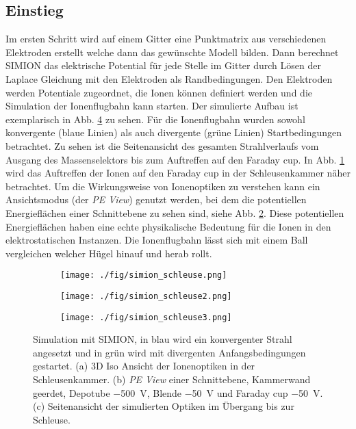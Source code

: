 \subsection{Einstieg}
Im ersten Schritt wird auf einem Gitter eine Punktmatrix aus verschiedenen Elektroden erstellt welche dann das gewünschte Modell bilden.
Dann berechnet SIMION das elektrische Potential für jede Stelle im Gitter durch Lösen der Laplace Gleichung mit den Elektroden als Randbedingungen.
Den Elektroden werden Potentiale zugeordnet, die Ionen können definiert werden und die Simulation der Ionenflugbahn kann starten.
Der simulierte Aufbau ist exemplarisch in Abb. \ref{fig:simion_schleuse} zu sehen.
Für die Ionenflugbahn wurden sowohl konvergente (blaue Linien) als auch divergente (grüne Linien) Startbedingungen betrachtet.
Zu sehen ist die Seitenansicht des gesamten Strahlverlaufs vom Ausgang des Massenselektors bis zum Auftreffen auf den Faraday cup.
In Abb. \ref{fig:0} wird das Auftreffen der Ionen auf den Faraday cup in der Schleusenkammer näher betrachtet.
Um die Wirkungsweise von Ionenoptiken zu verstehen kann ein Ansichtsmodus (der \textit{PE View}) genutzt werden, bei dem die potentiellen Energieflächen einer Schnittebene zu sehen sind, siehe Abb. \ref{fig:1}.
Diese potentiellen Energieflächen haben eine echte physikalische Bedeutung für die Ionen in den elektrostatischen Instanzen.
Die Ionenflugbahn lässt sich mit einem Ball vergleichen welcher Hügel hinauf und herab rollt.
\begin{figure}
  \centering
  \begin{subfigure}[h]{0.45\textwidth}
    \texttt{[image: ./fig/simion\_schleuse.png]}
    \caption{}
    \label{fig:0}
  \end{subfigure}\hfill
  \begin{subfigure}[h]{0.5\textwidth}
    \texttt{[image: ./fig/simion\_schleuse2.png]}
    \caption{}
    \label{fig:1}
  \end{subfigure}\hfill
  \begin{subfigure}[b]{1\textwidth}
    \texttt{[image: ./fig/simion\_schleuse3.png]}
    \caption{}
    \label{fig:2}
  \end{subfigure}
  \caption{Simulation mit SIMION, in blau wird ein konvergenter Strahl angesetzt und in grün wird mit divergenten Anfangsbedingungen gestartet. (a) 3D Iso Ansicht der Ionenoptiken in der Schleusenkammer. (b) \textit{PE View} einer Schnittebene, Kammerwand geerdet, Depotube \SI{-500}{\volt}, Blende \SI{-50}{\volt} und Faraday cup \SI{-50}{\volt}. (c) Seitenansicht der simulierten Optiken im Übergang bis zur Schleuse.}
  \label{fig:simion_schleuse}
\end{figure}
